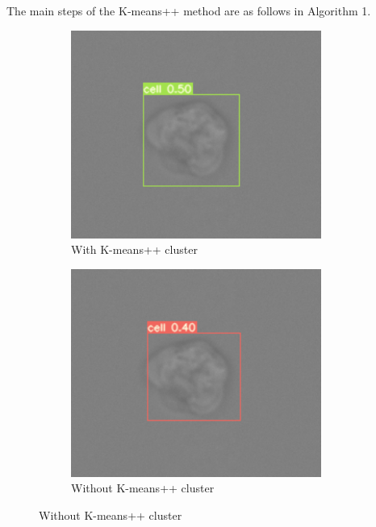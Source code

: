 The main steps of the K‐means++ method are as follows in Algorithm 1.
\begin{figure}[h]
	\begin{center}
		\begin{subfigure}[b]{0.49\textwidth}
		    \centering
			\includegraphics[width=0.9\textwidth]{thesis-template-master/images/withkmean.png}
			\caption{With K-means++ cluster}
			\label{fig:cellnet}
		\end{subfigure}
		\begin{subfigure}[b]{0.49\textwidth}
		    \centering
			\includegraphics[width=0.9\textwidth]{thesis-template-master/images/withoutkmean.png}
			\caption{Without K-means++ cluster}
			\label{fig:cellnet}
		\end{subfigure}

\end{center}
\end{figure}
